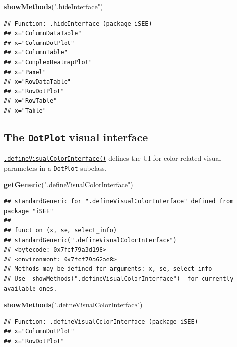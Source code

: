 \documentclass[
]{book}
\newenvironment{Shaded}{\begin{snugshade}}{\end{snugshade}}
\newcommand{\KeywordTok}[1]{\textcolor[rgb]{0.13,0.29,0.53}{\textbf{#1}}}
\newcommand{\NormalTok}[1]{#1}
\newcommand{\StringTok}[1]{\textcolor[rgb]{0.31,0.60,0.02}{#1}}
\begin{document}
\begin{Shaded}
\begin{Highlighting}[]
\KeywordTok{showMethods}\NormalTok{(}\StringTok{".hideInterface"}\NormalTok{)}
\end{Highlighting}
\end{Shaded}

\begin{verbatim}
## Function: .hideInterface (package iSEE)
## x="ColumnDataTable"
## x="ColumnDotPlot"
## x="ColumnTable"
## x="ComplexHeatmapPlot"
## x="Panel"
## x="RowDataTable"
## x="RowDotPlot"
## x="RowTable"
## x="Table"
\end{verbatim}

\hypertarget{the-dotplot-visual-interface}{%
\subsection{\texorpdfstring{The \texttt{DotPlot} visual interface}{The DotPlot visual interface}}\label{the-dotplot-visual-interface}}

\href{https://isee.github.io/iSEE/reference/visual-parameters-generics.html}{\texttt{.defineVisualColorInterface()}} defines the UI for color-related visual parameters in a \texttt{DotPlot} subclass.

\begin{Shaded}
\begin{Highlighting}[]
\KeywordTok{getGeneric}\NormalTok{(}\StringTok{".defineVisualColorInterface"}\NormalTok{)}
\end{Highlighting}
\end{Shaded}

\begin{verbatim}
## standardGeneric for ".defineVisualColorInterface" defined from package "iSEE"
## 
## function (x, se, select_info) 
## standardGeneric(".defineVisualColorInterface")
## <bytecode: 0x7fcf79a3d198>
## <environment: 0x7fcf79a62ae8>
## Methods may be defined for arguments: x, se, select_info
## Use  showMethods(".defineVisualColorInterface")  for currently available ones.
\end{verbatim}

\begin{Shaded}
\begin{Highlighting}[]
\KeywordTok{showMethods}\NormalTok{(}\StringTok{".defineVisualColorInterface"}\NormalTok{)}
\end{Highlighting}
\end{Shaded}

\begin{verbatim}
## Function: .defineVisualColorInterface (package iSEE)
## x="ColumnDotPlot"
## x="RowDotPlot"
\end{verbatim}
\end{document}
